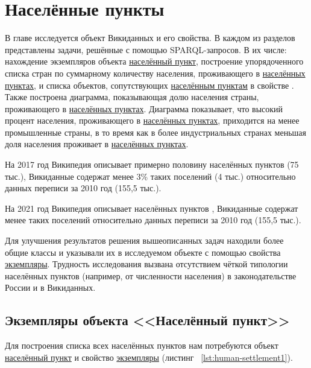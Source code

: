 \chapter{Населённые пункты}
\label{ch:human-settlement}

	В главе исследуется объект Викиданных  и его свойства. В каждом из разделов представлены задачи, решённые с помощью SPARQL-запросов. В их числе: нахождение экземпляров объекта \href{http://www.wikidata.org/entity/Q486972}{населённый пункт}, построение упорядоченного списка стран по суммарному количеству населения, проживающего в \href{http://www.wikidata.org/entity/Q486972}{населённых пунктах}, и списка объектов, сопутствующих \href{http://www.wikidata.org/entity/Q486972}{населённым пунктам} в свойстве . Также построена диаграмма, показывающая долю населения страны, проживающего в \href{http://www.wikidata.org/entity/Q486972}{населённых пунктах}. Диаграмма показывает, что высокий процент населения, проживающего в \href{http://www.wikidata.org/entity/Q486972}{населённых пунктах}, приходится на менее промышленные страны, в то время как в более индустриальных странах меньшая доля населения проживает в \href{http://www.wikidata.org/entity/Q486972}{населённых пунктах}. 

На 2017 год Википедия описывает примерно половину населённых пунктов (75 тыс.), Викиданные содержат менее 3\% таких поселений (4 тыс.) относительно данных переписи за 2010 год (155,5 тыс.). 

На 2021 год Википедия описывает населённых пунктов , Викиданные содержат менее  таких поселений относительно данных переписи за 2010 год (155,5 тыс.). 

Для улучшения результатов решения вышеописанных задач находили более общие классы и указывали их в исследуемом объекте с помощью свойства \href{http://www.wikidata.org/entity/P31}{экземпляры}. Трудность исследования вызвана отсутствием чёткой типологии населённых пунктов (например, от численности населения) в законодательстве России и в Викиданных.


\section{Экземпляры объекта <<Населённый пункт>>}

Для построения списка всех населённых пунктов нам потребуются объект 
\href{http://www.wikidata.org/entity/Q486972}{населённый пункт} и свойство \href{http://www.wikidata.org/entity/P31}{экземпляры}
(листинг ~\protect\ref{lst:human-settlement1}).

